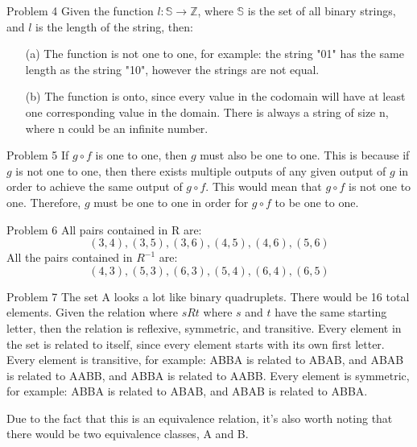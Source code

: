 \documentclass[12pt]{article}
\begin{document}
    \begin{problem}{Problem 4}
        Given the function $l: \mathbb{S} \rightarrow \mathbb{Z}$, where $\mathbb{S}$ is the set of all binary strings, and $l$ is the length of the string, then:
        \begin{itemize}
            \item[(a)] The function is not one to one, for example: the string "01" has the same length as the string "10", however the strings are not equal.
            \item[(b)] The function is onto, since every value in the codomain will have at least one corresponding value in the domain. There is always a string of
                       size n, where n could be an infinite number.
        \end{itemize}
    \end{problem}

    \begin{problem}{Problem 5}
        If $g \circ f$ is one to one, then $g$ must also be one to one. This is because if $g$ is not one to one, then there exists
        multiple outputs of any given output of $g$ in order to achieve the same output of $g \circ f$. This would mean that $g \circ f$ is not one to one.
        Therefore, $g$ must be one to one in order for $g \circ f$ to be one to one.
    \end{problem}

    \begin{problem}{Problem 6}
        All pairs contained in R are:
        \[(3, 4), (3, 5), (3, 6), (4, 5), (4, 6), (5, 6)\]
        All the pairs contained in $R^{-1}$ are: 
        \[(4, 3), (5, 3), (6, 3), (5, 4), (6, 4), (6, 5)\] 
    \end{problem}

    \begin{problem}{Problem 7}
        The set A looks a lot like binary quadruplets. There would be 16 total elements.
        Given the relation where $sRt$ where $s$ and $t$ have the same starting letter, then the relation is reflexive,
        symmetric, and transitive. Every element in the set is related to itself, since every element starts with its own first letter.
        Every element is transitive, for example: ABBA is related to ABAB, and ABAB is related to AABB, and ABBA is related to AABB.
        Every element is symmetric, for example: ABBA is related to ABAB, and ABAB is related to ABBA.

        Due to the fact that this is an equivalence relation, it's also worth noting that there would be two equivalence classes, A and B.
    \end{problem}
\end{document}
